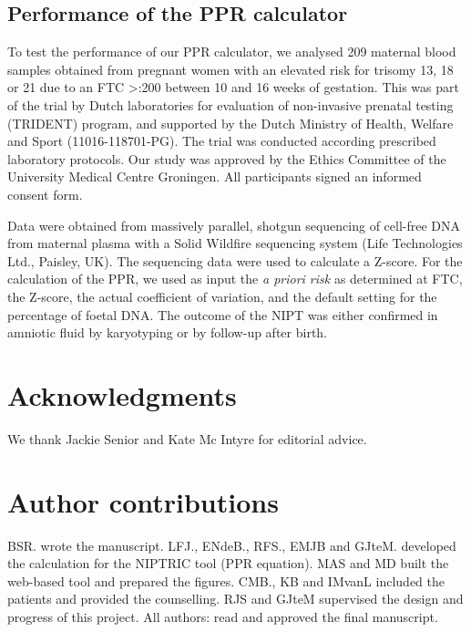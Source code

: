 \subsection{Performance of the PPR calculator}
To test the performance of our PPR calculator, we analysed 209 maternal blood samples obtained from pregnant women with an elevated risk for trisomy 13, 18 or 21 due to an FTC \textgreater{}:200 between 10 and 16 weeks of gestation. 
This was part of the trial by Dutch laboratories for evaluation of non-invasive prenatal testing (TRIDENT) program, and supported by the Dutch Ministry of Health, Welfare and Sport (11016-118701-PG). 
The trial was conducted according prescribed laboratory protocols. 
Our study was approved by the Ethics Committee of the University Medical Centre Groningen. 
All participants signed an informed consent form.

Data were obtained from massively parallel, shotgun sequencing of cell-free DNA from maternal plasma with a Solid Wildfire sequencing system (Life Technologies Ltd., Paisley, UK). 
The sequencing data were used to calculate a Z-score. 
For the calculation of the PPR, we used as input the \textsl{a priori risk} as determined at FTC, the Z-score, the actual coefficient of variation, and the default setting for the percentage of foetal DNA. 
The outcome of the NIPT was either confirmed in amniotic fluid by karyotyping or by follow-up after birth.

\section*{Acknowledgments}\label{Acknowledgments} 
We thank Jackie Senior and Kate Mc Intyre for editorial advice.

\section*{Author contributions}
BSR. wrote the manuscript. LFJ., ENdeB., RFS., EMJB and GJteM. developed the calculation for the NIPTRIC tool (PPR equation). MAS and MD built the web-based tool and prepared the figures. CMB., KB and IMvanL included the patients and provided the counselling. RJS and GJteM supervised the design and progress of this project. All authors: read and approved the final manuscript.
